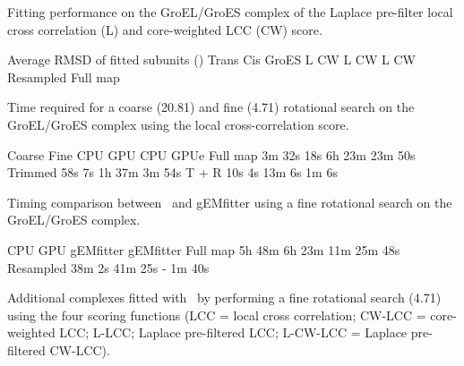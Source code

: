 \caption{}{Fitting performance on the GroEL/GroES complex of the Laplace
pre-filter local cross correlation (L) and core-weighted LCC (CW)
score.}
\stopbuffer

\bTABLE
\setupTABLE[r][1,2,3][style={\white\tfx\ss\bf}, background=color, backgroundcolor=darkgray]
\setupTABLE[c][1][width=8em]
\bTABLEhead
\bTR \bTD[nr=3] \eTD \bTD[nc=6] Average RMSD of fitted subunits (\Angstrom) \eTD \eTR
\bTR \bTD[nc=2] Trans \eTD \bTD[nc=2] Cis \eTD \bTD[nc=2] GroES \eTD \eTR
\bTR \bTD L \eTD \bTD CW \eTD \bTD L \eTD \bTD CW \eTD \bTD L \eTD \bTD CW \eTD \eTR
\eTABLEhead
\bTABLEbody
\bTR \bTD Resampled \eTD {} \eTD {} \eTD {} \eTD {} \eTD {} \eTD {} \eTD \eTR
\bTR \bTD Full map \eTD {} \eTD {} \eTD {} \eTD {} \eTD {} \eTD {} \eTD \eTR
\eTABLEbody
\eTABLE
\stopbuffer


\caption{}
{Time required for a coarse (20.81\Deg) and fine (4.71\Deg) rotational search on the
GroEL/GroES complex using the local cross-correlation score.}
\stopbuffer

\bTABLE
\bTABLEhead
\bTR \bTD[nr=2]  \eTD \bTD[nc=2] Coarse \eTD \bTD[nc=2] Fine \eTD \eTR
\bTR \bTD CPU \eTD \bTD GPU \eTD \bTD CPU \eTD \bTD  GPUe \eTD \eTR
\eTABLEhead
\bTR \bTD Full map \eTD \bTD 3m 32s  \eTD \bTD 18s \eTD \bTD 6h 23m  \eTD \bTD 23m 50s \eTD \eTR
\bTR \bTD Trimmed  \eTD \bTD 58s     \eTD \bTD 7s  \eTD \bTD 1h 37m  \eTD \bTD 3m 54s  \eTD \eTR
\bTR \bTD T + R    \eTD \bTD 10s     \eTD \bTD 4s  \eTD \bTD 13m 6s  \eTD \bTD 1m 6s   \eTD \eTR
\eTABLE
\stopbuffer


\caption{}
{Timing comparison between \powerfit\ and gEMfitter using a fine rotational search on the GroEL/GroES complex.}
\stopbuffer

\bTABLE
\bTR \bTD \eTD \bTD[nc=2] CPU \eTD \bTD[nc=2] GPU \eTD \eTR
\bTR \bTD \eTD \bTD gEMfitter \eTD \bTD \powerfit \eTD \bTD gEMfitter \eTD \bTD \powerfit \eTD \eTR
\bTR \bTD Full map \eTD \bTD 5h 48m \eTD \bTD 6h 23m \eTD \bTD 11m \eTD \bTD 25m 48s \eTD \eTR
\bTR \bTD Resampled \eTD \bTD 38m 2s \eTD \bTD 41m 25s \eTD \bTD - \eTD \bTD 1m 40s \eTD \eTR
\eTABLE
\stopbuffer


\caption{}
{Additional complexes fitted with \powerfit\ by performing a fine rotational
search (4.71\Deg) using the four scoring functions (LCC = local cross correlation;
CW-LCC = core-weighted LCC; L-LCC; Laplace pre-filtered LCC; L-CW-LCC = Laplace
pre-filtered CW-LCC).}
\stopbuffer

